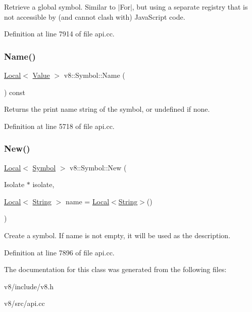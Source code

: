 Retrieve a global symbol. Similar to $\vert$\+For$\vert$, but using a separate registry that is not accessible by (and cannot clash with) Java\+Script code. 

Definition at line 7914 of file api.\+cc.

\mbox{\label{classv8_1_1Symbol_a8b6346ed4f396a1286fc50a95d84b79c}} 
\subsubsection{\texorpdfstring{Name()}{Name()}}
{\footnotesize\ttfamily \mbox{\hyperlink{classv8_1_1Local}{Local}}$<$ \mbox{\hyperlink{classv8_1_1Value}{Value}} $>$ v8\+::\+Symbol\+::\+Name (\begin{DoxyParamCaption}{ }\end{DoxyParamCaption}) const}

Returns the print name string of the symbol, or undefined if none. 

Definition at line 5718 of file api.\+cc.

\mbox{\label{classv8_1_1Symbol_ac241ffee8282d3067f8ed0da7be2adb8}} 
\subsubsection{\texorpdfstring{New()}{New()}}
{\footnotesize\ttfamily \mbox{\hyperlink{classv8_1_1Local}{Local}}$<$ \mbox{\hyperlink{classv8_1_1Symbol}{Symbol}} $>$ v8\+::\+Symbol\+::\+New (\begin{DoxyParamCaption}\item[{Isolate $\ast$}]{isolate,  }\item[{\mbox{\hyperlink{classv8_1_1Local}{Local}}$<$ \mbox{\hyperlink{classv8_1_1String}{String}} $>$}]{name = {\ttfamily \mbox{\hyperlink{classv8_1_1Local}{Local}}$<$\mbox{\hyperlink{classv8_1_1String}{String}}$>$()} }\end{DoxyParamCaption})\hspace{0.3cm}{\ttfamily [static]}}

Create a symbol. If name is not empty, it will be used as the description. 

Definition at line 7896 of file api.\+cc.



The documentation for this class was generated from the following files\+:\begin{DoxyCompactItemize}
\item 
v8/include/v8.\+h\item 
v8/src/api.\+cc\end{DoxyCompactItemize}
